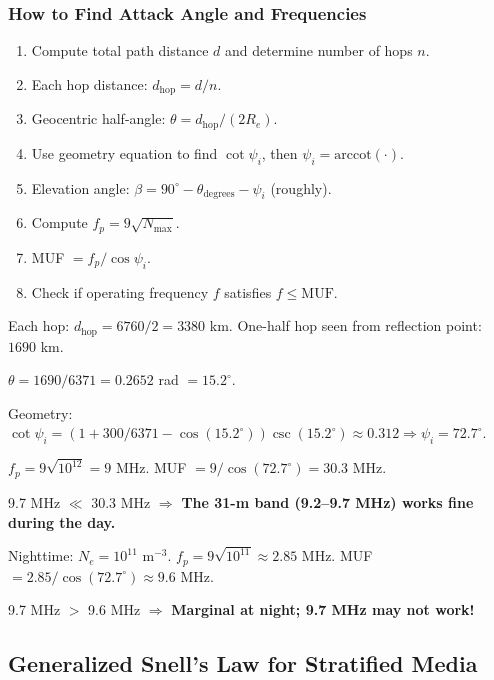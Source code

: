 \documentclass[10pt,letterpaper]{article}
\newcommand{\degrees}{^{\circ}}
\begin{document}
\subsubsection{How to Find Attack Angle and Frequencies}
\begin{enumerate}[noitemsep]
  \item Compute total path distance $d$ and determine number of hops $n$.
  \item Each hop distance: $d_\mathrm{hop} = d/n$.
  \item Geocentric half-angle: $\theta = d_\mathrm{hop}/(2R_e)$.
  \item Use geometry equation to find $\cot\psi_i$, then $\psi_i = \mathrm{arccot}(\cdot)$.
  \item Elevation angle: $\beta = 90\degrees - \theta_\mathrm{degrees} - \psi_i$ (roughly).
  \item Compute $f_p = 9\sqrt{N_\mathrm{max}}$.
  \item MUF $= f_p/\cos\psi_i$.
  \item Check if operating frequency $f$ satisfies $f \leq \mathrm{MUF}$.
\end{enumerate}

\begin{tcolorbox}[examplebox, title={HW8 P3 Example: Ohio to Europe (6760 km), 2 Hops, $N_e = 10^{12}$ m$^{-3}$}]
Each hop: $d_\mathrm{hop} = 6760/2 = 3380$ km. One-half hop seen from reflection point: $1690$ km.

$\theta = 1690/6371 = 0.2652$ rad $= 15.2\degrees$.

Geometry: $\cot\psi_i = \left(1 + 300/6371 - \cos(15.2\degrees)\right)\csc(15.2\degrees) \approx 0.312 \Rightarrow \psi_i = 72.7\degrees$.

$f_p = 9\sqrt{10^{12}} = 9$ MHz. MUF $= 9/\cos(72.7\degrees) = 30.3$ MHz.

9.7 MHz $\ll$ 30.3 MHz $\Rightarrow$ \textbf{The 31-m band (9.2--9.7 MHz) works fine during the day.}

Nighttime: $N_e = 10^{11}$ m$^{-3}$. $f_p = 9\sqrt{10^{11}} \approx 2.85$ MHz. MUF $= 2.85/\cos(72.7\degrees) \approx 9.6$ MHz. 

9.7 MHz $>$ 9.6 MHz $\Rightarrow$ \textbf{Marginal at night; 9.7 MHz may not work!}
\end{tcolorbox}

\subsection{Generalized Snell's Law for Stratified Media}
\end{document}
